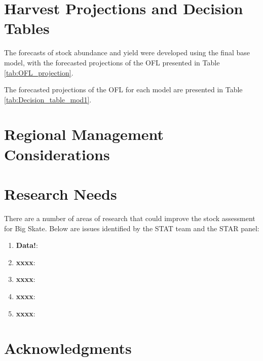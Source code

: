 \documentclass[12pt,]{article}
\begin{document}
\newpage

\hypertarget{harvest-projections-and-decision-tables}{%
\section{Harvest Projections and Decision
Tables}\label{harvest-projections-and-decision-tables}}

The forecasts of stock abundance and yield were developed using the
final base model, with the forecasted projections of the OFL presented
in Table \ref{tab:OFL_projection}.

The forecasted projections of the OFL for each model are presented in
Table \ref{tab:Decision_table_mod1}.

\newpage

\hypertarget{regional-management-considerations}{%
\section{Regional Management
Considerations}\label{regional-management-considerations}}

\newpage

\hypertarget{research-needs}{%
\section{Research Needs}\label{research-needs}}

There are a number of areas of research that could improve the stock
assessment for Big Skate. Below are issues identified by the STAT team
and the STAR panel:

\begin{enumerate}

\item \textbf{Data!}: 

\item \textbf{xxxx}:

\item \textbf{xxxx}:

\item \textbf{xxxx}:

\item \textbf{xxxx}:

\end{enumerate}

\hypertarget{acknowledgments}{%
\section{Acknowledgments}\label{acknowledgments}}
\end{document}
